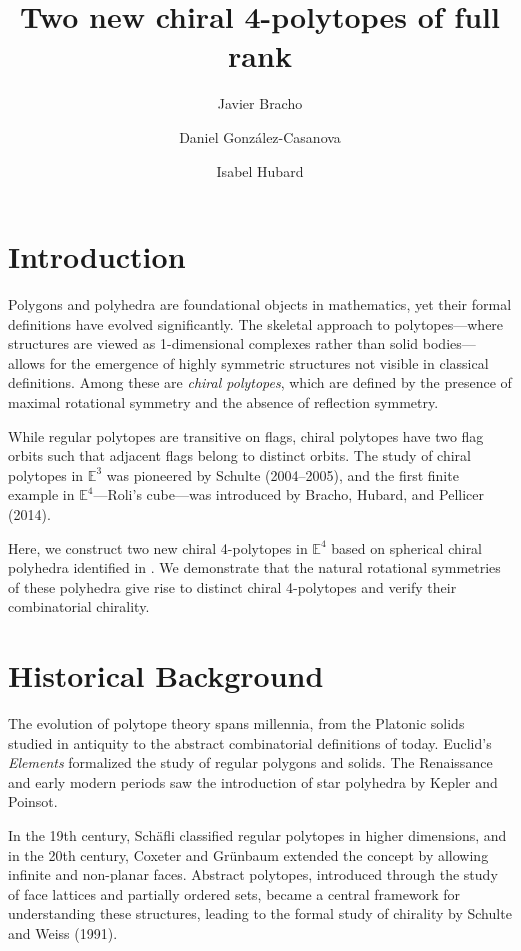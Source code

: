 \documentclass[oneside,final]{amsart}
\begin{document}
\title{Two new chiral 4-polytopes of full rank}
\author{Javier Bracho} 
\address{Institute of Mathematics, National Autonomous University of Mexico (IM UNAM), 04510 Mexico City, Mexico}
\author{Daniel Gonz\'alez-Casanova}
\address{Institute of Mathematics, National Autonomous University of Mexico (IM UNAM), 04510 Mexico City, Mexico}
\author{Isabel Hubard}
\address{Institute of Mathematics, National Autonomous University of Mexico (IM UNAM), 04510 Mexico City, Mexico}


\section{Introduction}
Polygons and polyhedra are foundational objects in mathematics, yet their formal definitions have evolved significantly. The skeletal approach to polytopes---where structures are viewed as 1-dimensional complexes rather than solid bodies---allows for the emergence of highly symmetric structures not visible in classical definitions. Among these are \emph{chiral polytopes}, which are defined by the presence of maximal rotational symmetry and the absence of reflection symmetry.

While regular polytopes are transitive on flags, chiral polytopes have two flag orbits such that adjacent flags belong to distinct orbits. The study of chiral polytopes in $\mathbb{E}^3$ was pioneered by Schulte (2004--2005), and the first finite example in $\mathbb{E}^4$---Roli's cube---was introduced by Bracho, Hubard, and Pellicer (2014).

Here, we construct two new chiral 4-polytopes in $\mathbb{E}^4$ based on spherical chiral polyhedra identified in \cite{BHP2021}. We demonstrate that the natural rotational symmetries of these polyhedra give rise to distinct chiral 4-polytopes and verify their combinatorial chirality.

\section{Historical Background}
The evolution of polytope theory spans millennia, from the Platonic solids studied in antiquity to the abstract combinatorial definitions of today. Euclid's \emph{Elements} formalized the study of regular polygons and solids. The Renaissance and early modern periods saw the introduction of star polyhedra by Kepler and Poinsot.

In the 19th century, Sch\"afli classified regular polytopes in higher dimensions, and in the 20th century, Coxeter and Gr\"unbaum extended the concept by allowing infinite and non-planar faces. Abstract polytopes, introduced through the study of face lattices and partially ordered sets, became a central framework for understanding these structures, leading to the formal study of chirality by Schulte and Weiss (1991).
\end{document}
